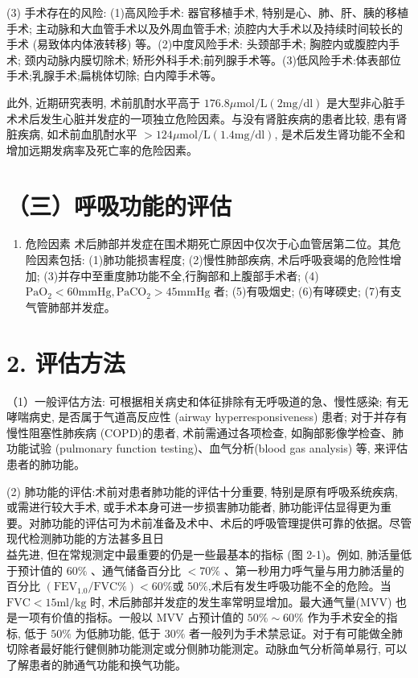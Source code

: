 \documentclass[10pt]{article}
\begin{document}
(3) 手术存在的风险: (1)高风险手术: 器官移植手术, 特别是心、肺、肝、胰的移植手术; 主动脉和大血管手术以及外周血管手术; 浈腔内大手术以及持续时间较长的手术 (易致体内体液转移) 等。(2)中度风险手术: 头颈部手术; 胸腔内或腹腔内手术; 颈内动脉内膜切除术; 矫形外科手术;前列腺手术等。(3)低风险手术:体表部位手术;乳腺手术;扁桃体切除; 白内障手术等。

此外, 近期研究表明, 术前肌酎水平高于 $176.8 \mu \mathrm{mol} / \mathrm{L}(2 \mathrm{mg} / \mathrm{dl})$ 是大型非心脏手术术后发生心脏并发症的一项独立危险因素。与没有肾脏疾病的患者比较, 患有肾脏疾病, 如术前血肌酎水平 $>124 \mu \mathrm{mol} / \mathrm{L}(1.4 \mathrm{mg} / \mathrm{dl})$, 是术后发生肾功能不全和增加远期发病率及死亡率的危险因素。

\section*{（三）呼吸功能的评估}
\begin{enumerate}
  \item 危险因素 术后肺部并发症在围术期死亡原因中仅次于心血管居第二位。其危险因素包括: (1)肺功能损害程度; (2)慢性肺部疾病, 术后呼吸衰竭的危险性增加; (3)并存中至重度肺功能不全,行胸部和上腹部手术者; (4) $\mathrm{PaO}_{2}<60 \mathrm{mmHg}, \mathrm{PaCO}_{2}>45 \mathrm{mmHg}$ 者; (5)有吸烟史; (6)有哮碝史; (7)有支气管肺部并发症。
\end{enumerate}

\section*{2. 评估方法}
（1）一般评估方法: 可根据相关病史和体征排除有无呼吸道的急、慢性感染; 有无哮喘病史, 是否属于气道高反应性 (airway hyperresponsiveness) 患者; 对于并存有慢性阻塞性肺疾病 (COPD)的患者, 术前需通过各项检查, 如胸部影像学检查、肺功能试验 (pulmonary function testing)、血气分析(blood gas analysis) 等, 来评估患者的肺功能。

(2) 肺功能的评估:术前对患者肺功能的评估十分重要, 特别是原有呼吸系统疾病, 或需进行较大手术, 或手术本身可进一步损害肺功能者, 肺功能评估显得更为重要。对肺功能的评估可为术前准备及术中、术后的呼吸管理提供可靠的依据。尽管现代检测肺功能的方法甚多且日\\
益先进, 但在常规测定中最重要的仍是一些最基本的指标 (图 2-1)。例如, 肺活量低于预计值的 $60 \%$ 、通气储备百分比 $<70 \%$ 、第一秒用力呼气量与用力肺活量的百分比 $\left(\mathrm{FEV}_{1.0} / \mathrm{FVC} \%\right)<60 \%$或 $50 \%$,术后有发生呼吸功能不全的危险。当 $\mathrm{FVC}<15 \mathrm{ml} / \mathrm{kg}$ 时, 术后肺部并发症的发生率常明显增加。最大通气量(MVV) 也是一项有价值的指标。一般以 MVV 占预计值的 $50 \% \sim 60 \%$ 作为手术安全的指标, 低于 $50 \%$ 为低肺功能, 低于 $30 \%$ 者一般列为手术禁忌证。对于有可能做全肺切除者最好能行健侧肺功能测定或分侧肺功能测定。动脉血气分析简单易行, 可以了解患者的肺通气功能和换气功能。
\end{document}
